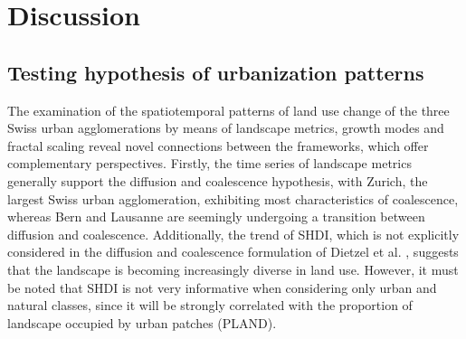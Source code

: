\documentclass[10pt,letterpaper]{article}
\begin{document}

\section*{Discussion}

\subsection*{Testing hypothesis of urbanization patterns}

The examination of the spatiotemporal patterns of land use change of the three Swiss urban agglomerations by means of landscape metrics, growth modes and fractal scaling reveal novel connections between the frameworks, which offer complementary perspectives.
Firstly, the time series of landscape metrics generally support the diffusion and coalescence hypothesis, with Zurich, the largest Swiss urban agglomeration, exhibiting most characteristics of coalescence, whereas Bern and Lausanne are seemingly undergoing a transition between diffusion and coalescence. Additionally, the trend of SHDI, which is not explicitly considered in the diffusion and coalescence formulation of Dietzel et al. \cite{dietzel2005spatio}, suggests that the landscape is becoming increasingly diverse in land use. %
However, it must be noted that SHDI is not very informative when considering only urban and natural classes, since it will be strongly correlated with the proportion of landscape occupied by urban patches (PLAND).
\end{document}
